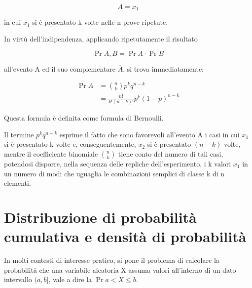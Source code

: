 {
    \Large 
    \begin{equation}
        A = {x_1}
    \end{equation}
}

in cui $x_1$ si è presentato k volte nelle n prove ripetute. \newline 

In virtù dell'indipendenza, applicando ripetutamente il risultato 

{
    \Large 
    \begin{equation}
        \Pr{A, B} = \Pr{A} \cdot \Pr{B}
    \end{equation}
}

all'evento A ed il suo complementare $\overline{A}$, si trova immediatamente: 

{
    \Large
    \begin{equation}
        \begin{split}
            \Pr{A} 
            &= 
            \binom{n}{k} 
            p^{k} 
            q^{n - k} 
            \\ 
            &=
            \frac{n!}{k! (n-k)!}
            p^{k} 
            (1-p)^{n-k}    
        \end{split}
    \end{equation}
}

Questa formula è definita come formula di Bernoulli. \newline 

Il termine $p^{k} q^{n-k}$ esprime il fatto che sono favorevoli all'evento A i casi in cui $x_1$ 
si è presentato k volte e, conseguentemente, $x_2$ si è presentato $(n-k)$ volte, 
mentre il coefficiente binomiale $\binom{n}{k}$ tiene conto del numero di tali casi, 
potendosi disporre, nella sequenza delle repliche dell'esperimento, i k valori $x_1$ in un numero di modi che uguaglia le combinazioni semplici di classe 
k di n elementi. \newline 

\newpage 

\section{Distribuzione di probabilità cumulativa e densità di probabilità} 

In molti contesti di interesse pratico, si pone il problema di calcolare la probabilità che una variabile aleatoria X 
assuma valori all'interno di un dato intervallo $(a, b]$, vale a dire la 
$\Pr{a < X \leq b}$. \newline 

